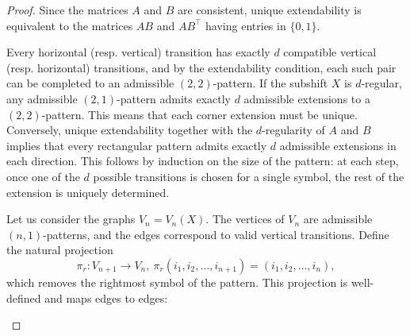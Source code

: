 \documentclass[12pt]{article}
\theoremstyle{definition}
\begin{document}
\begin{proof}
Since the matrices $A$ and $B$ are consistent, unique extendability is equivalent to the matrices $AB$ and $AB^\top$ having entries in $\{0,1\}$.

Every horizontal (resp. vertical) transition has exactly $d$ compatible vertical (resp. horizontal) transitions, and by the extendability condition, each such pair can be completed to an admissible $(2,2)$-pattern. If the subshift $X$ is $d$-regular, any admissible $(2,1)$-pattern admits exactly $d$ admissible extensions to a $(2,2)$-pattern. This means that each corner extension must be unique.
Conversely, unique extendability together with the $d$-regularity of $A$ and $B$ implies that every rectangular pattern admits exactly $d$ admissible extensions in each direction. This follows by induction on the size of the pattern: at each step, once one of the $d$ possible transitions is chosen for a single symbol, the rest of the extension is uniquely determined.

Let us consider the graphs $V_n=V_n(X)$. The vertices of $V_n$ are admissible $(n,1)$-patterns, and the edges correspond to valid vertical transitions. Define the natural projection
\[
\pi_r: V_{n+1}\rightarrow V_n, \ \pi_r(i_1,i_2,\ldots,i_{n+1})=(i_1,i_2,\ldots,i_{n}),
\]
which removes the rightmost symbol of the pattern. This projection is well-defined and maps edges to edges:
\begin{center}
\end{center}
\end{proof}
\end{document}
